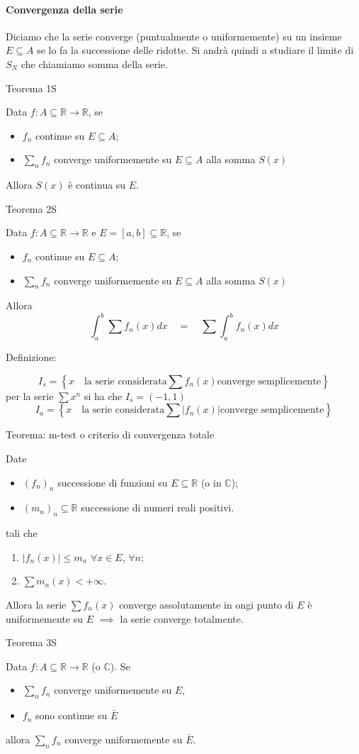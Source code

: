 \documentclass[x11names]{article}
\newcommand{\definizione}[2]{
	\begin{center}
		\fboxsep11pt
		\colorbox{myblue}{\begin{minipage}{5.75in}
				\begin{blues}{Definizione: #1}
					#2
				\end{blues}
		\end{minipage}}
	\end{center}
}
\newcommand{\teorema}[2]{
	\begin{center}
		\fboxsep11pt
		\colorbox{myred}{\begin{minipage}{5.75in}
				\begin{redes}{#1}
					#2
				\end{redes}
		\end{minipage}}
	\end{center}
}
\begin{document}
\paragraph{Convergenza della serie} Diciamo che la serie converge (puntualmente o uniformemente) su un insieme \(E\subseteq A\) se lo fa la successione delle ridotte. Si andrà quindi a studiare il limite di \(S_{N}\) che chiamiamo somma della serie.

\teorema{Teorema 1S}{
Data \(f:A\subseteq \mathbb{R} \to \mathbb{R}\), se
\begin{itemize}
	\item \(f_{n}\) continue su \(E\subseteq A\);
	\item \(\sum_n f_{n}\) converge uniformemente su \(E\subseteq A\) alla somma \(S(x)\)
\end{itemize}
Allora \(S(x)\) è continua su \(E\).}
\teorema{Teorema 2S}{
Data \(f:A\subseteq \mathbb{R} \to \mathbb{R}\) e \(E = [a,b]\subseteq \mathbb{R}\), se
\begin{itemize}
\item \(f_{n}\) continue su \(E\subseteq A\);
\item \(\sum_n f_{n}\) converge uniformemente su \(E\subseteq A\) alla somma \(S(x)\)
\end{itemize}
Allora
\[ 
\int_{a}^{b} \sum f_{n}(x)dx \quad  = \quad \sum \int_{a}^{b}  f_{n}(x)dx 
\]}

\definizione{}{
	\[ 
	I_{s} = \left\{x \;\:\;\ \text{la serie considerata} \sum f_{n}(x) \text{converge semplicemente} \right\}
	\]
	per la serie \(\sum x^n\) si ha che \(I_{s} = (-1,1)\)
	\[ 
	I_{a} = \left\{x \;\:\;\ \text{la serie considerata} \sum |f_{n}(x)| \text{converge semplicemente} \right\}
	\]
}

\teorema{Teorema: m-test o criterio di convergenza totale}{
Date 
\begin{itemize}
	\item \((f_{n})_{n}\) successione di funzioni su \(E\subseteq \mathbb{R}\) (o in \(\mathbb{C}\));
	\item \((m_{n})_{n} \subseteq \mathbb{R}\) successione di numeri reali positivi. 
\end{itemize}
tali che
\begin{enumerate}[start=1,label={(\itshape H\arabic*)}]
	\item \(|f_{n}(x)|\leq m_{n}\) \(\forall x \in E\), \(\forall n\);
	\item \(\sum m_{n}(x) < + \infty\).
\end{enumerate}
Allora la serie \(\sum f_{n}(x)\) converge assolutamente in ongi punto di \(E\) è uniformemente su \(E\) \(\implies\) la serie converge totalmente.}


\teorema{Teorema 3S}{
	Data \(f:A\subseteq \mathbb{R} \to \mathbb{R}\) (o \(\mathbb{C}\)). Se
	\begin{itemize}
		\item \(\sum_n f_{n}\) converge uniformemente su \(E\),
		\item \(f_{n}\) sono continue su \(\bar{E}\)
	\end{itemize}
	allora \(\sum_n f_{n}\) converge uniformemente su \(\bar{E}\).
}


	
\end{document}
